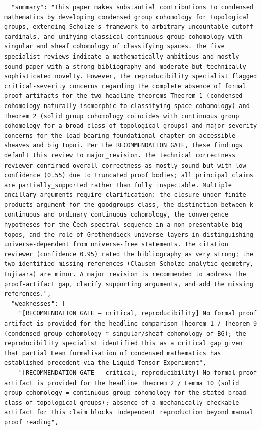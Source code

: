 \documentclass[11pt]{article}
\begin{document}
\begin{verbatim}
  "summary": "This paper makes substantial contributions to condensed mathematics by developing condensed group cohomology for topological groups, extending Scholze's framework to arbitrary uncountable cutoff cardinals, and unifying classical continuous group cohomology with singular and sheaf cohomology of classifying spaces. The five specialist reviews indicate a mathematically ambitious and mostly sound paper with a strong bibliography and moderate but technically sophisticated novelty. However, the reproducibility specialist flagged critical-severity concerns regarding the complete absence of formal proof artifacts for the two headline theorems—Theorem 1 (condensed cohomology naturally isomorphic to classifying space cohomology) and Theorem 2 (solid group cohomology coincides with continuous group cohomology for a broad class of topological groups)—and major-severity concerns for the load-bearing foundational chapter on accessible sheaves and big topoi. Per the RECOMMENDATION GATE, these findings default this review to major_revision. The technical correctness reviewer confirmed overall_correctness as mostly_sound but with low confidence (0.55) due to truncated proof bodies; all principal claims are partially_supported rather than fully inspectable. Multiple ancillary arguments require clarification: the closure-under-finite-products argument for the goodgroups class, the distinction between k-continuous and ordinary continuous cohomology, the convergence hypotheses for the Čech spectral sequence in a non-presentable big topos, and the role of Grothendieck universe layers in distinguishing universe-dependent from universe-free statements. The citation reviewer (confidence 0.95) rated the bibliography as very strong; the two identified missing references (Clausen-Scholze analytic geometry, Fujiwara) are minor. A major revision is recommended to address the proof-artifact gap, clarify supporting arguments, and add the missing references.",
  "weaknesses": [
    "[RECOMMENDATION GATE — critical, reproducibility] No formal proof artifact is provided for the headline comparison Theorem 1 / Theorem 9 (condensed group cohomology ≅ singular/sheaf cohomology of BG); the reproducibility specialist identified this as a critical gap given that partial Lean formalisation of condensed mathematics has established precedent via the Liquid Tensor Experiment",
    "[RECOMMENDATION GATE — critical, reproducibility] No formal proof artifact is provided for the headline Theorem 2 / Lemma 10 (solid group cohomology = continuous group cohomology for the stated broad class of topological groups); absence of a mechanically checkable artifact for this claim blocks independent reproduction beyond manual proof reading",

\end{verbatim}
\end{document}
